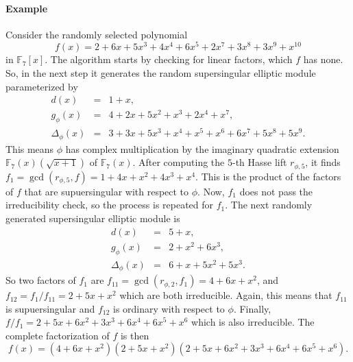 \documentclass[12pt]{article}
\theoremstyle{plain}
\theoremstyle{definition}
\def\F{\ensuremath{\mathbb{F}}}
\begin{document}
\paragraph{Example}
Consider the randomly selected polynomial 
\[ f(x) = 2 + 6x + 5x^3 + 4x^4 + 6x^5 + 2x^7 + 3x^8 + 3x^9 + x^{10} \]
in $\F_7[x]$. The algorithm starts by checking for linear factors, which $f$ has none. So, in the 
next step it generates the random supersingular elliptic module parameterized by
\[
\begin{array}{rll}
	d(x) & = & 1 + x, \\
	g_\phi(x) & = & 4 + 2x + 5x^2 + x^3 + 2x^4 + x^7, \\
	\Delta_\phi(x) & = & 3 + 3x + 5x^3 + x^4 + x^5 + x^6 + 6x^7 + 5x^8 + 5x^9.
\end{array}
\]
This means $\phi$ has complex multiplication by the imaginary quadratic extension $\F_7(x)(\sqrt{x 
+ 1})$ of $\F_7(x)$. After computing the $5$-th Hasse lift $r_{\phi, 5}$, it finds $f_1 = 
\gcd(r_{\phi, 5}, f) = 1 + 4x + x^2 + 4x^3 + x^4$. This is the product of the factors of $f$ that 
are supuersingular with respect to $\phi$. Now, $f_1$ does not pass the irreducibility check, so 
the process is repeated for $f_1$. The next randomly generated supersingular elliptic module is
\[
\begin{array}{rll}
	d(x) & = & 5 + x, \\
	g_\phi(x) & = & 2 + x^2 + 6x^3, \\
	\Delta_\phi(x) & = & 6 + x + 5x^2 + 5x^3.
\end{array}
\]
So two factors of $f_1$ are $f_{11} = \gcd(r_{\phi, 2}, f_1) = 4 + 6x + x^2$, and $f_{12} = f_1 / 
f_{11} = 2 + 5x + x^2$ which are both irreducible. Again, this means that $f_{11}$ is 
supuersingular and $f_{12}$ is ordinary with respect to $\phi$. Finally, $f / f_1 = 2 + 5x + 6x^2 + 
3x^3 + 6x^4 + 6x^5 + x^6$ which is also irreducible. The complete factorization of $f$ is then
\[ f(x) = (4 + 6x + x^2)(2 + 5x + x^2)(2 + 5x + 6x^2 + 3x^3 + 6x^4 + 6x^5 + x^6).\]




\end{document}
